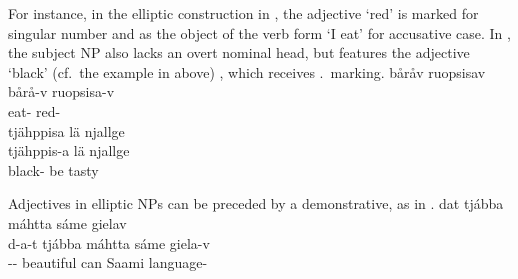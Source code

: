 For instance, in the elliptic construction in , the adjective  ‘red’ %
is marked for singular number and as the object of the verb form  ‘I eat’ for accusative case. In , the subject NP also lacks an overt nominal head, but features the adjective  ‘black’ (cf.~the example in  above)%
, which receives \NOMs.\PLs\ marking. 
\ea\label{adjNPheadEx1}
\glll	båråv ruopsisav\\
	bårå-v ruopsisa-v\\
	eat- red-\\\nopagebreak
{}	
\z
\ea\label{adjNPheadEx2}
\glll	tjähppisa lä njallge\\
	tjähppis-a lä njallge\\
	black- be\BS{} tasty\BS{}\\\nopagebreak
{}	
\z

Adjectives in elliptic NPs can be preceded by a demonstrative, %
as in . 
\vfill
\clearpage
\ea\label{adjNPheadEx3}
\glll	dat tjábba máhtta sáme gielav\\
	d-a-t tjábba máhtta sáme giela-v\\
	-- beautiful\BS{} can\BS{} Saami\BS{} language-\\\nopagebreak
{}	
\z

